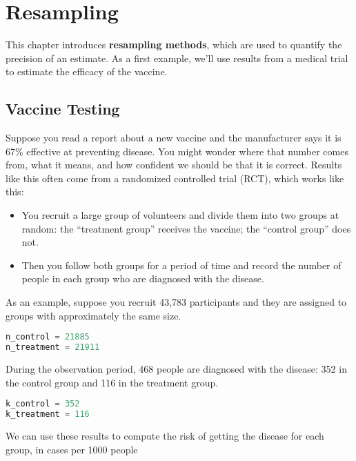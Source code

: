 \chapter{Resampling}\label{resampling}

This chapter introduces \textbf{resampling methods}, which are used to
quantify the precision of an estimate. As a first example, we'll use
results from a medical trial to estimate the efficacy of the vaccine.

\section{Vaccine Testing}\label{vaccine-testing}

Suppose you read a report about a new vaccine and the manufacturer says
it is 67\% effective at preventing disease. You might wonder where that
number comes from, what it means, and how confident we should be that it
is correct. Results like this often come from a randomized controlled
trial (RCT), which works like this:

\begin{itemize}
\item
  You recruit a large group of volunteers and divide them into two
  groups at random: the ``treatment group'' receives the vaccine; the
  ``control group'' does not.
\item
  Then you follow both groups for a period of time and record the number
  of people in each group who are diagnosed with the disease.
\end{itemize}

As an example, suppose you recruit 43,783 participants and they are
assigned to groups with approximately the same size.

\begin{lstlisting}[language=Python,style=source]
n_control = 21885
n_treatment = 21911
\end{lstlisting}

During the observation period, 468 people are diagnosed with the
disease: 352 in the control group and 116 in the treatment group.

\begin{lstlisting}[language=Python,style=source]
k_control = 352
k_treatment = 116
\end{lstlisting}

We can use these results to compute the risk of getting the disease for
each group, in cases per 1000 people

